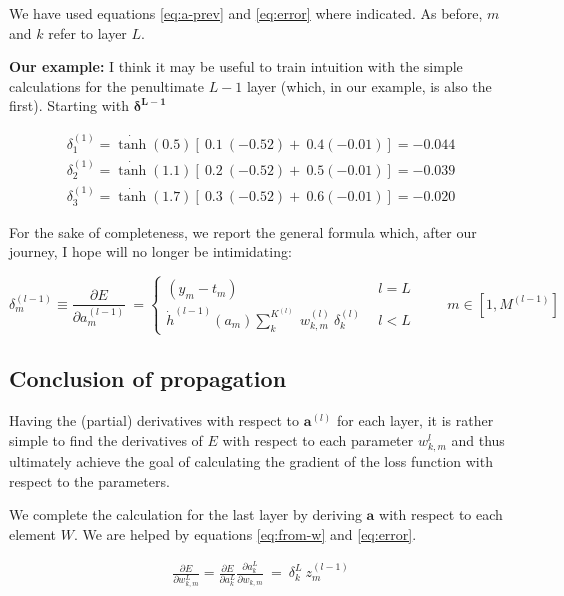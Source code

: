 \documentclass{article}
\begin{document}
We have used equations \eqref{eq:a-prev} and \eqref{eq:error} where indicated. As before, $m$ and $k$ refer to layer $L$.

\textbf{Our example:} I think it may be useful to train intuition with the simple calculations for the penultimate $L-1$ layer (which, in our example, is also the first). Starting with $\boldsymbol{\delta^{L-1}}$


\begin{gather*}
\delta _{1}^{( 1)} =\dot{\tanh}( 0.5)[ \ 0.1\ ( -0.52) +\ 0.4( -0.01)] =-0.044\\
\delta _{2}^{( 1)} =\dot{\tanh}( 1.1)[ \ 0.2\ ( -0.52) +\ 0.5( -0.01)] =-0.039\\
\delta _{3}^{( 1)} =\dot{\tanh}( 1.7)[ \ 0.3\ ( -0.52) +\ 0.6( -0.01)] =-0.020
\end{gather*}

\begin{center}\textleaf\end{center}


For the sake of completeness, we report the general formula which, after our journey, I hope will no longer be intimidating:


\begin{equation}
\delta _{m}^{( l-1)} \equiv \frac{\partial E}{\partial a_{m}^{( l-1)}} \ =\begin{cases}
( y_{m} -t_{m}) & l=L\\
\dot{h}^{( l-1)}( a_{m})\sum _{k}^{K^{( l)}} \ w_{k,m}^{( l)} \ \delta _{k}^{( l)} \ \  & l< L
\end{cases} \ \ \ \ \ \ \ \ \ \ m\in \left[ 1,M^{( l-1)}\right] \label{eq:backprop}
\end{equation}


\subsection{Conclusion of propagation}

Having the (partial) derivatives with respect to $\boldsymbol{a}^{(l)}$ for each layer, it is rather simple to find the derivatives of $E$ with respect to each parameter $w_{k,m}^{l}$ and thus ultimately achieve the goal of calculating the gradient of the loss function with respect to the parameters.

We complete the calculation for the last layer by deriving $\boldsymbol{a}$ with respect to each element $W$. We are helped by equations \eqref{eq:from-w} and \eqref{eq:error}.

\begin{gather*}
\frac{\partial E}{\partial w_{k,m}^{L}}
= \frac{\partial E}{\partial a_{k}^{L}} \frac{\partial a_{k}^{L}}{\partial w_{k,m}} \ =\ \delta_k^{L} \ z_{m}^{( l-1)} \label{eq:delta-from-w}
\end{gather*}\\
\end{document}
